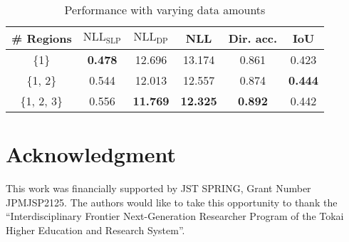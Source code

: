 \documentclass[letterpaper, 10 pt, conference]{ieeeconf}
\begin{document}
\begin{table}[t]\caption{Performance with varying data amounts}
\vspace{-4mm}
\begin{center}
\begin{tabular}{|c|c|c|c|c|c|}
    \hline
     \# Regions & $\text{NLL}_{\text{SLP}}$ & $\text{NLL}_{\text{DP}}$ & NLL & Dir. acc. & IoU \\ \hline
    \{1\} & \textbf{0.478} & 12.696 & 13.174 & 0.861 & 0.423 \\ \hline
    \{1, 2\} & 0.544 & 12.013 & 12.557 & 0.874 & \textbf{0.444} \\ \hline
    \{1, 2, 3\} & 0.556 & \textbf{11.769} & \textbf{12.325} & \textbf{0.892} & 0.442 \\ \hline
\end{tabular}
\label{tab:data_amount}
\end{center}
\vspace{-7.5mm}
\end{table}













\section*{Acknowledgment}

This work was financially supported by JST SPRING, Grant Number JPMJSP2125. The authors would like to take this opportunity to thank the ``Interdisciplinary Frontier Next-Generation Researcher Program of the Tokai Higher Education and Research System''.
\end{document}
